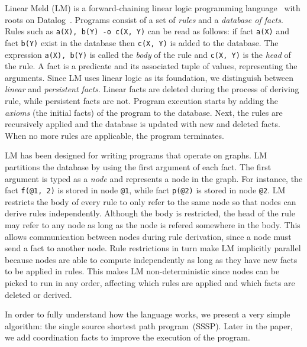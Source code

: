 
Linear Meld (LM) is a forward-chaining linear logic programming
language~\cite{cruz-iclp14} with roots on Datalog~\cite{Ramakrishnan93asurvey}.
Programs consist of a set of \emph{rules} and a \emph{database of facts}.
Rules such as \texttt{a(X), b(Y) -o c(X, Y)} can be read as follows: if fact \texttt{a(X)}
and fact \texttt{b(Y)} exist in the database then \texttt{c(X, Y)} is added to
the database. The expression \texttt{a(X), b(Y)} is called the \emph{body} of
the rule and \texttt{c(X, Y)} is the \emph{head} of the rule.
A fact is a predicate and its associated tuple of values, representing the
arguments. Since LM uses linear logic as its foundation, we distinguish between
\emph{linear} and \emph{persistent facts}. Linear facts are deleted during the
process of deriving rule, while persistent facts are not.
Program execution starts by adding the \emph{axioms} (the initial facts) of the program to the database.
Next, the rules are recursively applied and the database is updated with new and
deleted facts. When no more rules are applicable, the program terminates.

LM has been designed for writing programs that operate on graphs. LM partitions
the database by using the first argument of each fact. The first argument is
typed as a \emph{node} and represents a node in the graph. For instance, the
fact \texttt{f(@1, 2)} is stored in node \texttt{@1}, while fact \texttt{p(@2)}
is stored in node \texttt{@2}. LM restricts
the body of every rule to only refer to the same node so that nodes can derive
rules independently. Although the body is restricted, the head of the
rule may refer to any node as long as the node is refered somewhere in the
body. This allows communication between nodes during rule derivation, since a
node must send a fact to another node.
Rule restrictions in turn make LM implicitly parallel because nodes are able to
compute independently as long as they have new facts to be applied in rules.
This makes LM non-deterministic since nodes can be picked to run in any order,
affecting which rules are applied and which facts are deleted or derived.

In order to fully understand how the language works, we present a very simple
algorithm: the single source shortest path program~(SSSP). Later in the paper, we
add coordination facts to improve the execution of the program.

